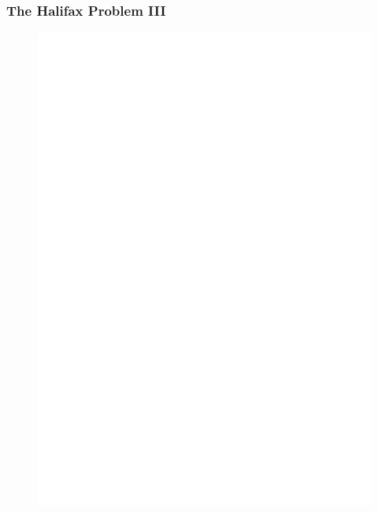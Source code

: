 \documentclass[xcolor=dvipsnames]{beamer}
\begin{document}
\begin{frame}
  \frametitle{The Halifax Problem III}
  \begin{figure}[h]
    \includegraphics[scale=.7]{./bcita-02.eps}
  \end{figure}
\end{frame}
\end{document}
